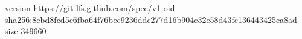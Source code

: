version https://git-lfs.github.com/spec/v1
oid sha256:8cbd8fcd5c6fba64f76bec9236ddc277d16b904c32e58d43fc136443425ca8ad
size 349660
